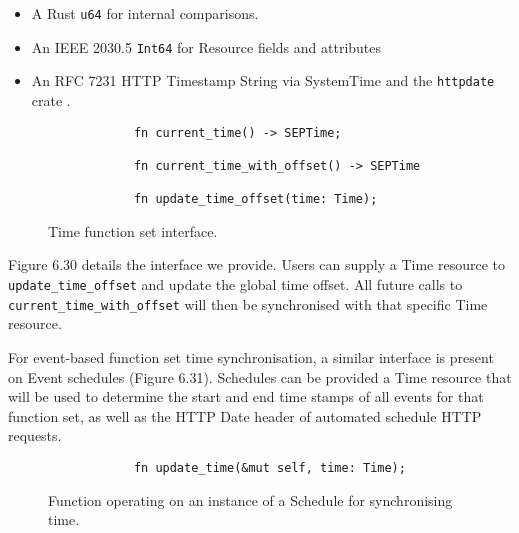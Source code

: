\begin{itemize}
    \item A Rust \texttt{u64} for internal comparisons.
    \item An IEEE 2030.5 \texttt{Int64} for Resource fields and attributes
    \item An RFC 7231 HTTP Timestamp String via SystemTime and the \texttt{httpdate} crate \cite{httpdate}.
\end{itemize} 


\begin{figure}[h]
    \begin{center}
        \begin{lstlisting}
            fn current_time() -> SEPTime;
            
            fn current_time_with_offset() -> SEPTime
            
            fn update_time_offset(time: Time);
        \end{lstlisting}
        \label{fig:timeinterface}
        \vspace{-10pt}
        \caption{Time function set interface.}
    \end{center}
\end{figure}

Figure 6.30 details the interface we provide. Users can supply a Time resource to \texttt{update\_time\_offset} and update the global time offset. All future calls to \texttt{current\_time\_with\_offset} will then be synchronised with that specific Time resource.

For event-based function set time synchronisation, a similar interface is present on Event schedules (Figure 6.31). Schedules can be provided a Time resource that will be used to determine the start and end time stamps of all events for that function set, as well as the HTTP Date header of automated schedule HTTP requests.

\begin{figure}[h]
    \begin{center}
        \begin{lstlisting}
            fn update_time(&mut self, time: Time);
        \end{lstlisting}
        \label{fig:eventtime}
        \vspace{-10pt}
        \caption{Function operating on an instance of a Schedule for synchronising time.}
    \end{center}
\end{figure}

